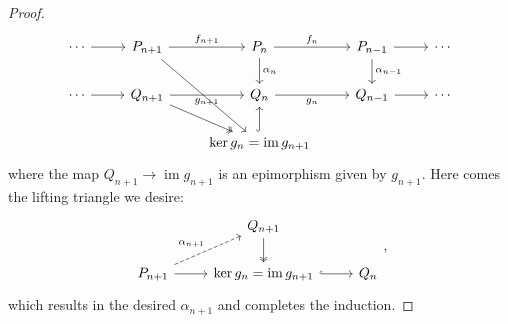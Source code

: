 \documentclass[10pt]{report}
\theoremstyle{definition}
\begin{document}
\begin{proof}
$$\begin{tikzcd}
\cdots \arrow[r] & P_{n+1} \arrow[r, "f_{n+1}"] \arrow[rdd]            & P_n \arrow[d, "\alpha_n"] \arrow[r, "f_n"]        & P_{n-1} \arrow[r] \arrow[d, "\alpha_{n-1}"] & \cdots \\
\cdots \arrow[r] & Q_{n+1} \arrow[r, "g_{n+1}"'] \arrow[rd, two heads] & Q_n \arrow[r, "g_n"']                             & Q_{n-1} \arrow[r]                           & \cdots \\
                 &                                                     & \ker g_n=\operatorname{im}g_{n+1} \arrow[u, hook] &                                             &
\end{tikzcd}
$$
where the map $Q_{n+1}\to\operatorname{im}g_{n+1}$ is an epimorphism given by $g_{n+1}$.
Here comes the lifting triangle we desire:
$$
\begin{tikzcd}
                                                     & Q_{n+1} \arrow[d, two heads]                      &     \\
P_{n+1} \arrow[r] \arrow[ru, "\alpha_{n+1}", dashed] & \ker g_n=\operatorname{im}g_{n+1} \arrow[r, hook] & Q_n
\end{tikzcd},
$$
which results in the desired $\alpha_{n+1}$ and completes the induction.
\end{proof}
\end{document}
